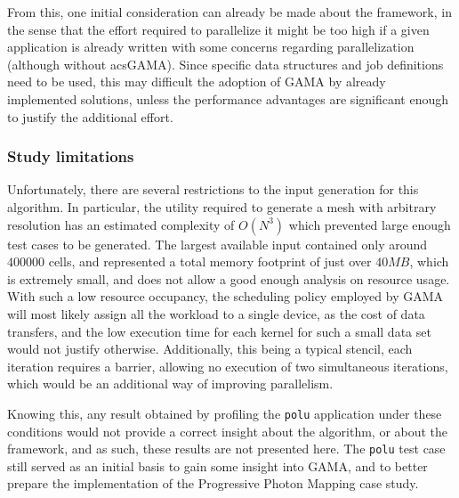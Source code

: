 \documentclass[main.tex]{subfiles}
\begin{document}
From this, one initial consideration can already be made about the framework, in the sense that the effort required to parallelize it might be too high if a given application is already written with some concerns regarding parallelization (although without acs{GAMA}). Since specific data structures and job definitions need to be used, this may difficult the adoption of \acs{GAMA} by already implemented solutions, unless the performance advantages are significant enough to justify the additional effort.


\subsubsection{Study limitations}

Unfortunately, there are several restrictions to the input generation for this algorithm. In particular, the utility required to generate a mesh with arbitrary resolution has an estimated complexity of $O(N^3)$ which prevented large enough test cases to be generated. The largest available input contained only around $400000$ cells, and represented a total memory footprint of just over $40MB$, which is extremely small, and does not allow a good enough analysis on resource usage. With such a low resource occupancy, the scheduling policy employed by \acs{GAMA} will most likely assign all the workload to a single device, as the cost of data transfers, and the low execution time for each kernel for such a small data set would not justify otherwise. Additionally, this being a typical stencil, each iteration requires a barrier, allowing no execution of two simultaneous iterations, which would be an additional way of improving parallelism.

Knowing this, any result obtained by profiling the \texttt{polu} application under these conditions would not provide a correct insight about the algorithm, or about the framework, and as such, these results are not presented here.
The \texttt{polu} test case still served as an initial basis to gain some insight into \acs{GAMA}, and to better prepare the implementation of the Progressive Photon Mapping case study.
\end{document}
